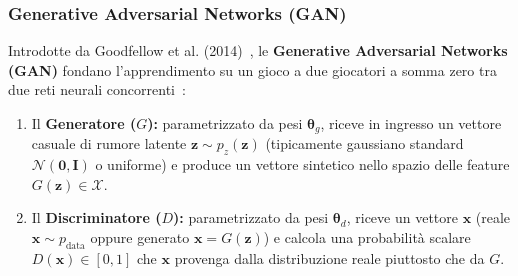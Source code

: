 \FloatBarrier
\subsubsection{Generative Adversarial Networks (GAN)}
\label{subsec:dm-gan}

Introdotte da Goodfellow et al. (2014)~\cite{goodfellow2014}, le \textbf{Generative Adversarial Networks (GAN)} fondano l'apprendimento su un gioco a due giocatori a somma zero tra due reti neurali concorrenti~\cite{mannocci2026imbalanced}:
\begin{enumerate}
    \item Il \textbf{Generatore ($G$):} parametrizzato da pesi $\boldsymbol{\theta}_g$, riceve in ingresso un vettore casuale di rumore latente $\mathbf{z} \sim p_z(\mathbf{z})$ (tipicamente gaussiano standard $\mathcal{N}(\mathbf{0}, \mathbf{I})$ o uniforme) e produce un vettore sintetico nello spazio delle feature $G(\mathbf{z}) \in \mathcal{X}$.
    \item Il \textbf{Discriminatore ($D$):} parametrizzato da pesi $\boldsymbol{\theta}_d$, riceve un vettore $\mathbf{x}$ (reale $\mathbf{x} \sim p_{\text{data}}$ oppure generato $\mathbf{x} = G(\mathbf{z})$) e calcola una probabilità scalare $D(\mathbf{x}) \in [0, 1]$ che $\mathbf{x}$ provenga dalla distribuzione reale piuttosto che da $G$.
\end{enumerate}

